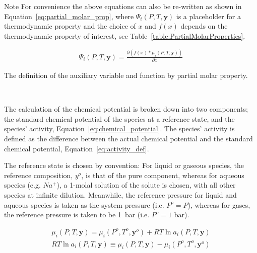     \begin{notes}{Note}
        For convenience the above equations can also be re-written as shown in Equation~\ref{eq:partial_molar_prop}, where \(\Psi_i (P,T, \mathbf{y})\) is a placeholder for a thermodynamic property and the choice of \(x\) and \(f(x)\) depends on the thermodynamic property of interest, see Table~\ref{table:PartialMolarProperties}. 

        \begin{align}
            \Psi_i (P, T, \mathbf{y}) = \frac{ \partial \left( f(x)*\mu_i (P, T, \mathbf{y}) \right)} {\partial x } \label{eq:partial_molar_prop}
        \end{align}

        \begin{table}[H]
            \caption{The definition of the auxiliary variable and function by partial molar property.}
            \centering 
            \label{table:PartialMolarProperties}
                    
            \\[10pt]
        \end{table}
    \end{notes}

    The calculation of the chemical potential is broken down into two components; the standard chemical potential of the species at a reference state, and the species’ activity, Equation~\ref{eq:chemical_potential}. The species’ activity is defined as the difference between the actual chemical potential and the standard chemical potential, Equation~\ref{eq:activity_def}.
    
    The reference state is chosen by convention: For liquid or gaseous species, the reference composition, \(y^o\), is that of the pure component, whereas for aqueous species (e.g. \(Na^+\)), a 1-molal solution of the solute is chosen, with all other species at infinite dilution. Meanwhile, the reference pressure for liquid and aqueous species is taken as the system pressure (i.e. \(P^o=P\)), whereas for gases, the reference pressure is taken to be \qty{1}{\bar} (i.e. \(P^o=1\) \unit{\bar}).

    \begin{align}
        \mu_i (P, T, \mathbf{y}) = \mu_i (P^o, T^o, \mathbf{y}^o) + RT \ln a_i (P, T, \mathbf{y}) \label{eq:chemical_potential}
    \end{align}
        \begin{align}
        RT \ln a_i (P, T, \mathbf{y}) \equiv \mu_i (P, T, \mathbf{y}) - \mu_i (P^o, T^o, \mathbf{y}^o) \label{eq:activity_def}
    \end{align}

